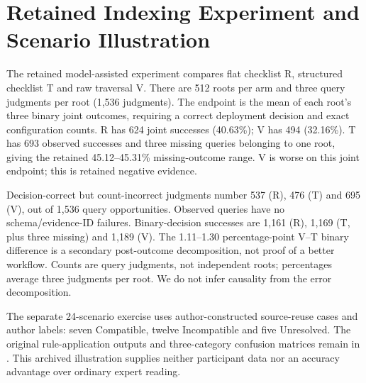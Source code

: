 \section{Retained Indexing Experiment and Scenario Illustration}\label{app:scope-workflow-boundary}
The retained model-assisted experiment compares flat checklist R, structured checklist T and raw \scope{} traversal V. There are 512 roots per arm and three query judgments per root (1,536 judgments). The endpoint is the mean of each root's three binary joint outcomes, requiring a correct deployment decision and exact configuration counts. R has 624 joint successes (40.63\%); V has 494 (32.16\%). T has 693 observed successes and three missing queries belonging to one root, giving the retained 45.12--45.31\% missing-outcome range. V is worse on this joint endpoint; this is retained negative evidence.

Decision-correct but count-incorrect judgments number 537 (R), 476 (T) and 695 (V), out of 1,536 query opportunities. Observed queries have no schema/evidence-ID failures. Binary-decision successes are 1,161 (R), 1,169 (T, plus three missing) and 1,189 (V). The 1.11--1.30 percentage-point V--T binary difference is a secondary post-outcome decomposition, not proof of a better workflow. Counts are query judgments, not independent roots; percentages average three judgments per root. We do not infer causality from the error decomposition.

The separate 24-scenario exercise uses author-constructed source-reuse cases and author labels: seven Compatible, twelve Incompatible and five Unresolved. The original rule-application outputs and three-category confusion matrices remain in . This archived illustration supplies neither participant data nor an accuracy advantage over ordinary expert reading.
